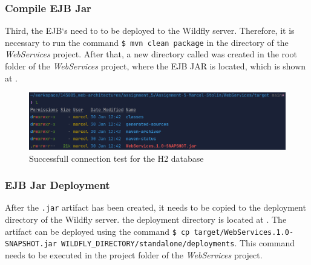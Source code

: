 \subsubsection{Compile EJB Jar}\label{sec:03_depl_wildfly_jar}
Third, the EJB`s need to to be deployed to the Wildfly server. Therefore, it is necessary to run the command \texttt{\$ mvn clean package} in the directory of the \textit{WebServices} project. After that, a new directory called  was created in the root folder of the \textit{WebServices} project, where the EJB JAR  is located, which is shown at .
\begin{figure}[h]
\centering
\includegraphics[scale=0.2]{images/03_depl/ejb-jar}
\caption{Successfull connection test for the H2 database}
\label{fig:03_depl_wildfly_jar_build}
\end{figure}


\subsubsection{EJB Jar Deployment}\label{sec:03_depl_wildfly_deploy}
After the \texttt{.jar} artifact has been created, it needs to be copied to the deployment directory of the Wildfly server. the deployment directory is located at . The artifact can be deployed using the command \texttt{\$ cp target/WebServices.1.0-SNAPSHOT.jar WILDFLY\_DIRECTORY/standalone/deployments}. This command needs to be executed in the project folder of the \textit{WebServices} project.


